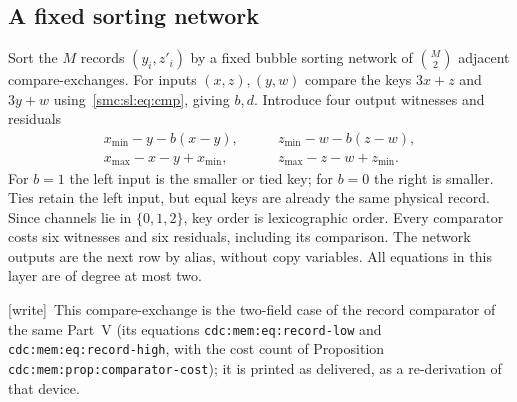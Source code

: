 \documentclass[11pt,letterpaper]{article}
\numberwithin{equation}{section}
\theoremstyle{definition}
\theoremstyle{remark}
\newcommand{\wtag}{\textup{[write]}}
\begin{document}
\subsection{A fixed sorting network}
Sort the $M$ records $(y_i,z'_i)$ by a fixed bubble sorting network of $\binom M2$ adjacent compare-exchanges. For inputs $(x,z),(y,w)$ compare the keys $3x+z$ and $3y+w$ using~\eqref{smc:sl:eq:cmp}, giving $b,d$. Introduce four output witnesses and residuals
\begin{align}
 x_{\min}-y-b(x-y),&\qquad z_{\min}-w-b(z-w),\nonumber\\
 x_{\max}-x-y+x_{\min},&\qquad z_{\max}-z-w+z_{\min}.\label{smc:sl:eq:sort}
\end{align}
For $b=1$ the left input is the smaller or tied key; for $b=0$ the right is smaller. Ties retain the left input, but equal keys are already the same physical record. Since channels lie in $\{0,1,2\}$, key order is lexicographic order. Every comparator costs six witnesses and six residuals, including its comparison. The network outputs are the next row by alias, without copy variables. All equations in this layer are of degree at most two.

\wtag\ This compare-exchange is the two-field case of the record comparator of the same Part~V (its equations \texttt{cdc:mem:eq:record-low} and \texttt{cdc:mem:eq:record-high}, with the cost count of Proposition \texttt{cdc:mem:prop:comparator-cost}); it is printed as delivered, as a re-derivation of that device.
\end{document}
